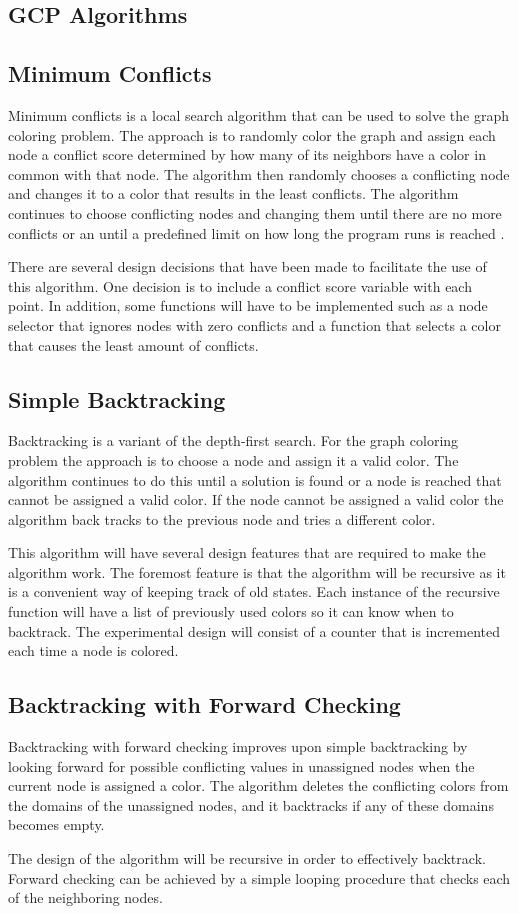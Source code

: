 \documentclass{article}
\begin{document}
\begin{multicols}{2}
\section{GCP Algorithms}
\label{algorithms}
\subsection{Minimum Conflicts}
Minimum conflicts is a local search algorithm that can be used to solve the graph coloring problem. The approach is to randomly color the graph and assign each node a conflict score determined by how many of its neighbors have a color in common with that node. The algorithm then randomly chooses a conflicting node and changes it to a color that results in the least conflicts. The algorithm continues to choose conflicting nodes and changing them until there are no more conflicts or an until a predefined limit on how long the program runs is reached \cite{ai}. \par
There are several design decisions that have been made to facilitate the use of this algorithm. One decision is to include a conflict score variable with each point. In addition, some functions will have to be implemented such as a node selector that ignores nodes with zero conflicts and a function that selects a color that causes the least amount of conflicts.
\subsection{Simple Backtracking}
Backtracking is a variant of the depth-first search. For the graph coloring problem the approach is to choose a node and assign it a valid color. The algorithm continues to do this until a solution is found or a node is reached that cannot be assigned a valid color. If the node cannot be assigned a valid color the algorithm back tracks to the previous node and tries a different color.  \par
This algorithm will have several design features that are required to make the algorithm work. The foremost feature is that the algorithm will be recursive as it is a convenient way of keeping track of old states. Each instance of the recursive function will have a list of previously used colors so it can know when to backtrack. The experimental design will consist of a counter that is incremented each time a node is colored. 
\subsection{Backtracking with Forward Checking}
Backtracking with forward checking improves upon simple backtracking by looking forward for possible conflicting values in unassigned nodes when the current node is assigned a color.  The algorithm deletes the conflicting colors from the domains of the unassigned nodes, and it backtracks if any of these domains becomes empty. \par
The design of the algorithm will be recursive in order to effectively backtrack.  Forward checking can be achieved by a simple looping procedure that checks each of the neighboring nodes. \par

\end{multicols}
\end{document}
